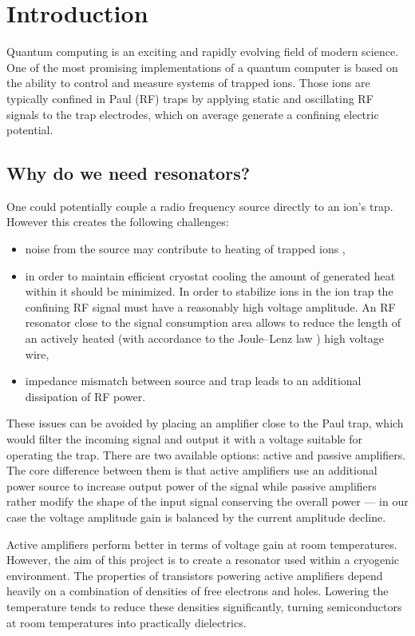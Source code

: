 \newcommand{\package}{\emph}

\chapter{Introduction}
Quantum computing is an exciting and rapidly evolving field of modern science. One of the most promising implementations of a quantum computer is based on the ability to control and measure systems of trapped ions. Those ions are typically confined in Paul (RF) \cite{Paul1990} traps by applying static and oscillating RF signals to the trap electrodes, which on average generate a confining electric potential.
\section{Why do we need resonators?}
\label{sec:why_resonators}
One could potentially couple a radio frequency source directly to an ion's trap. However this creates the following challenges:
\begin{itemize}
	\item noise from the source may contribute to heating of trapped ions \cite{Turchette2000},
	\item in order to maintain efficient cryostat cooling the amount of generated heat within it should be minimized. In order to stabilize ions in the ion trap the 	confining RF signal must have a reasonably high voltage amplitude. An RF resonator close to the signal consumption area allows to reduce the length of an actively heated (with accordance to the Joule–Lenz law \cite{Prokhorov1972}) high voltage wire,
	\item impedance mismatch between source and trap leads to an additional dissipation of RF power.
\end{itemize}
These issues can be avoided by placing an amplifier close to the Paul trap, which would filter the incoming signal and output it with a voltage suitable for operating the trap. There are two available options: active and passive amplifiers. The core difference between them is that active amplifiers use an additional power source to increase output power of the signal while passive amplifiers rather modify the shape of the input signal conserving the overall power --- in our case the voltage amplitude gain is balanced by the current amplitude decline. 

Active amplifiers perform better in terms of voltage gain at room temperatures. However, the aim of this project is to create a resonator used within a cryogenic environment. The properties of transistors powering active amplifiers depend heavily on a combination of densities of free electrons and holes. Lowering the temperature tends to reduce \cite{Dirac1926} these densities significantly, turning semiconductors at room temperatures into practically dielectrics. 

